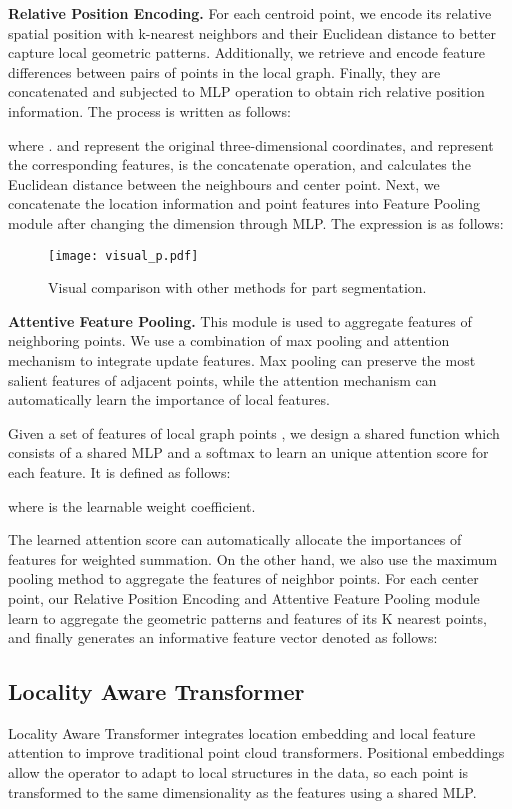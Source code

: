 \documentclass[conference]{IEEEtran}
\begin{document}
{\bf Relative Position Encoding.} For each centroid point, we encode its relative spatial position with k-nearest neighbors and their Euclidean distance to better capture local geometric patterns. Additionally, we retrieve and encode feature differences between pairs of points in the local graph. Finally, they are concatenated and subjected to MLP operation to obtain rich relative position information. The process is written as follows:

where .  and  represent the original three-dimensional coordinates,  and  represent the corresponding features,  is the concatenate operation, and  calculates the Euclidean distance between the neighbours and center point.
Next, we concatenate the location information and point features into  Feature Pooling module after changing the dimension through MLP. The expression is as follows:


\begin{figure*}[t]
    \centering
   \texttt{[image: visual\_p.pdf]}
   \vspace{-8pt}
   \caption{Visual comparison with other methods for part segmentation.}
\label{visual_p}
\vspace{-4mm}
\end{figure*}


{\bf Attentive Feature Pooling.} This module is used to aggregate features of neighboring points. We use a combination of max pooling and attention mechanism to integrate update features. Max pooling can preserve the most salient features of adjacent points, while the attention mechanism can automatically learn the importance of local features. 

Given a set of features of local graph points , we design a shared function  which consists of a shared MLP and a softmax to learn an unique attention score for each feature. It is defined as follows:

where  is the learnable weight coefficient.

The learned attention score can automatically allocate the importances of  features for weighted summation. On the other hand, we also use the maximum pooling method to aggregate the features of neighbor points. For each center point, our Relative Position Encoding and Attentive Feature Pooling module learn to aggregate the geometric patterns and features of its K nearest points, and finally generates an informative feature vector  denoted as follows:

\subsection{Locality Aware Transformer} Locality Aware Transformer integrates location embedding and local feature attention to improve traditional point cloud transformers. Positional embeddings allow the operator to adapt to local structures in the data, so each point is transformed to the same dimensionality as the features using a shared MLP. 
\end{document}
